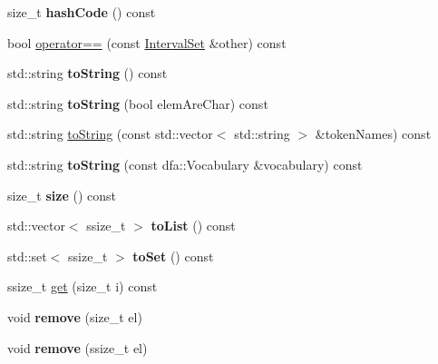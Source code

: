 \begin{DoxyCompactItemize}
\mbox{\label{classantlr4_1_1misc_1_1IntervalSet_aad88eb36ed05f285f0871982070a8fa7}} 
size\+\_\+t {\bfseries hash\+Code} () const
\item 
bool \hyperlink{classantlr4_1_1misc_1_1IntervalSet_a47ad0522ad659ed9b80d16ada050390c}{operator==} (const \hyperlink{classantlr4_1_1misc_1_1IntervalSet}{Interval\+Set} \&other) const
\item 
\mbox{\label{classantlr4_1_1misc_1_1IntervalSet_a8ad8fd554f7cf35c896287e7e2be1e63}} 
std\+::string {\bfseries to\+String} () const
\item 
\mbox{\label{classantlr4_1_1misc_1_1IntervalSet_ae43c9223eb4175c1ef49cd770555142b}} 
std\+::string {\bfseries to\+String} (bool elem\+Are\+Char) const
\item 
std\+::string \hyperlink{classantlr4_1_1misc_1_1IntervalSet_aca1798065f0f309e559c6c6efc07b6b1}{to\+String} (const std\+::vector$<$ std\+::string $>$ \&token\+Names) const
\item 
\mbox{\label{classantlr4_1_1misc_1_1IntervalSet_a760e5bff7db3cc0d1a14db3c6cd43de8}} 
std\+::string {\bfseries to\+String} (const dfa\+::\+Vocabulary \&vocabulary) const
\item 
\mbox{\label{classantlr4_1_1misc_1_1IntervalSet_a5586fbe7a38bb76ce570b770c44a07a1}} 
size\+\_\+t {\bfseries size} () const
\item 
\mbox{\label{classantlr4_1_1misc_1_1IntervalSet_af9bd9a3eba25401ded890f4c0aefb152}} 
std\+::vector$<$ ssize\+\_\+t $>$ {\bfseries to\+List} () const
\item 
\mbox{\label{classantlr4_1_1misc_1_1IntervalSet_a18229c7c3e238e561e3ef0aef98ceefb}} 
std\+::set$<$ ssize\+\_\+t $>$ {\bfseries to\+Set} () const
\item 
ssize\+\_\+t \hyperlink{classantlr4_1_1misc_1_1IntervalSet_a71e9df51ea033526f7efd519841da32e}{get} (size\+\_\+t i) const
\item 
\mbox{\label{classantlr4_1_1misc_1_1IntervalSet_a3da04b62224782f63599594039b4379a}} 
void {\bfseries remove} (size\+\_\+t el)
\item 
\mbox{\label{classantlr4_1_1misc_1_1IntervalSet_a0af27c35f8a90179f41d7db9bf3d00d4}} 
void {\bfseries remove} (ssize\+\_\+t el)
\end{DoxyCompactItemize}
